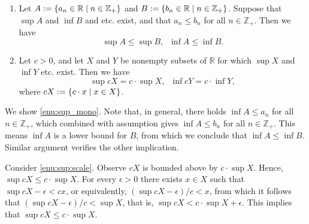 \documentclass[a4paper,12pt]{article}
\begin{document}
\begin{prp}\label{prop:supremum}
	\leavevmode \par
	\begin{enumerate}
		\item \label{enu:sup_mono}
		      Let
		      \( A:=\left\{ a_n \in \mathbb{R} \;|\; n \in \mathbb{Z}_{+} \right\} \)
		      and
		      \( B:=\left\{ b_n \in \mathbb{R} \;|\; n \in \mathbb{Z}_{+} \right\} \).
		      Suppose that
		      \( \sup{A} \)
		      and
		      \( \inf{B} \)
		      and etc.\! exist,
		      and that
		      \( a_n \le b_n \)
		      for all \( n \in \mathbb{Z}_{+} \).
		      Then we have
		      \begin{equation*}
			      \sup{A} \le \sup{B},\;\; \inf{A} \le \inf{B}.
		      \end{equation*}
		\item \label{enu:sup:scale}
		      Let
		      \( c>0 \), and
		      let \( X \) and \( Y \) be nonempty subsets of \( \mathbb{R} \)
		      for which \( \sup{X} \) and \( \inf{Y} \) etc.\! exist.
		      Then we have
		      \begin{equation*}
			      \sup{cX}=c \cdot \sup{X},\;\;\inf{cY}=c \cdot \inf{Y},
		      \end{equation*}
		      where \( cX:=\left\{ c \cdot x \;|\; x\in X \right\} \).
	\end{enumerate}
\end{prp}
\begin{prf}
	We show \ref{enu:sup_mono}.
	Note that, in general, there holds
	\( \inf{A} \le a_n \)
	for all \( n \in \mathbb{Z}_{+} \),
	which combined with assumption gives
	\( \inf{A} \le b_n \)
	for all
	\( n \in \mathbb{Z}_{+} \).
	This means
	\( \inf{A} \)
	is a lower bound for
	\( B \),
	from which we conclude that
	\( \inf{A} \le \inf {B} \).
	Similar argument verifies the other implication.
	
	Consider \ref{enu:sup:scale}.
	Observe
	\( cX \)
	is bounded above by
	\( c \cdot \sup{X} \).
	Hence,
	\( \sup{cX} \le c \cdot \sup{X} \).
	For every
	\( \epsilon>0 \)
	there exists 
	\( x\in X \)
	such that
	\( \sup{cX} - \epsilon < cx \),
	or equivalently,
	\( \left( \sup{cX} - \epsilon \right)/c <x \),
	from which it follows that
	\( \left( \sup{cX} - \epsilon \right)/c <\sup{X} \),
	that is,
	\( \sup{cX}<c \cdot \sup{X} + \epsilon\).
	This implies that
	\( \sup{cX} \le c \cdot \sup{X}\).
\end{prf}
\end{document}
